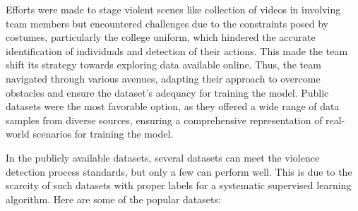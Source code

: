 \noindent Efforts were made to stage violent scenes like collection of videos in \cite{kineticData} involving team members but encountered challenges due to the constraints posed by costumes, particularly the college uniform, which hindered the accurate identification of individuals and detection of their actions. This made the team shift its strategy towards exploring data available online. Thus, the team navigated through various avenues, adapting their approach to overcome obstacles and ensure the dataset's adequacy for training the model. Public datasets were the most favorable option, as they offered a wide range of data samples from diverse sources, ensuring a comprehensive representation of real-world scenarios for training the model.

\noindent In the publicly available datasets, several datasets can meet the violence detection process standards, but only a few can perform well. This is due to the scarcity of such datasets with proper labels for a systematic supervised learning algorithm. Here are some of the popular datasets:

\vspace{-5mm}

